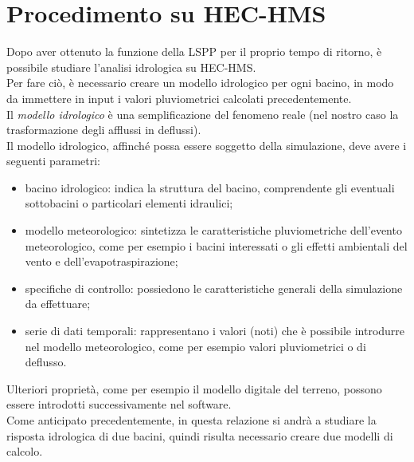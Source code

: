 \section{Procedimento su HEC-HMS}
Dopo aver ottenuto la funzione della LSPP per il proprio tempo di ritorno, è possibile studiare l'analisi idrologica su HEC-HMS.\\
Per fare ciò, è necessario creare un modello idrologico per ogni bacino, in modo da immettere in input i valori pluviometrici calcolati precedentemente.\\
Il \textit{modello idrologico} è una semplificazione del fenomeno reale (nel nostro caso la trasformazione degli afflussi in deflussi).\\
Il modello idrologico, affinché possa essere soggetto della simulazione, deve avere i seguenti parametri:
\begin{itemize}
    \item bacino idrologico: indica la struttura del bacino, comprendente gli eventuali sottobacini o particolari elementi idraulici;
    \item modello meteorologico: sintetizza le caratteristiche pluviometriche dell'evento meteorologico, come per esempio i bacini interessati o gli effetti ambientali del vento e dell'evapotraspirazione;
    \item specifiche di controllo: possiedono le caratteristiche generali della simulazione da effettuare;
    \item serie di dati temporali: rappresentano i valori (noti) che è possibile introdurre nel modello meteorologico, come per esempio valori pluviometrici o di deflusso.
\end{itemize}
 Ulteriori proprietà, come per esempio il modello digitale del terreno, possono essere introdotti successivamente nel software.\\
 Come anticipato precedentemente, in questa relazione si andrà a studiare la risposta idrologica di due bacini, quindi risulta necessario creare due modelli di calcolo.

